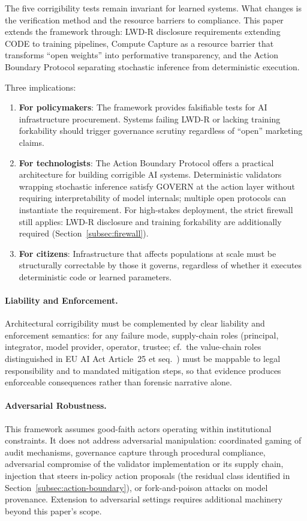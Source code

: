 \documentclass{article}
\theoremstyle{definition}
\begin{document}
The five corrigibility tests remain invariant for learned systems. What changes is the verification method and the resource barriers to compliance. This paper extends the framework through: LWD-R disclosure requirements extending CODE to training pipelines, Compute Capture as a resource barrier that transforms ``open weights'' into performative transparency, and the Action Boundary Protocol separating stochastic inference from deterministic execution.

Three implications:

\begin{enumerate}[noitemsep]
    \item \textbf{For policymakers}: The framework provides falsifiable tests for AI infrastructure procurement. Systems failing LWD-R or lacking training forkability should trigger governance scrutiny regardless of ``open'' marketing claims.

    \item \textbf{For technologists}: The Action Boundary Protocol offers a practical architecture for building corrigible AI systems. Deterministic validators wrapping stochastic inference satisfy GOVERN at the action layer without requiring interpretability of model internals; multiple open protocols can instantiate the requirement. For high-stakes deployment, the strict firewall still applies: LWD-R disclosure and training forkability are additionally required (Section~\ref{subsec:firewall}).

    \item \textbf{For citizens}: Infrastructure that affects populations at scale must be structurally correctable by those it governs, regardless of whether it executes deterministic code or learned parameters.
\end{enumerate}

\paragraph{Liability and Enforcement.} Architectural corrigibility must be complemented by clear liability and enforcement semantics: for any failure mode, supply-chain roles (principal, integrator, model provider, operator, trustee; cf.\ the value-chain roles distinguished in EU AI Act Article~25 et seq.\ \citep{euaiact2024}) must be mappable to legal responsibility and to mandated mitigation steps, so that evidence produces enforceable consequences rather than forensic narrative alone.

\paragraph{Adversarial Robustness.} This framework assumes good-faith actors operating within institutional constraints. It does not address adversarial manipulation: coordinated gaming of audit mechanisms, governance capture through procedural compliance, adversarial compromise of the validator implementation or its supply chain, injection that steers in-policy action proposals (the residual class identified in Section~\ref{subsec:action-boundary}), or fork-and-poison attacks on model provenance. Extension to adversarial settings requires additional machinery beyond this paper's scope.
\end{document}

